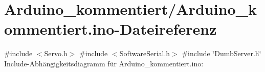 \hypertarget{Arduino__kommentiert_8ino}{}\section{Arduino\+\_\+kommentiert/\+Arduino\+\_\+kommentiert.ino-\/\+Dateireferenz}
\label{Arduino__kommentiert_8ino}
{\ttfamily \#include $<$Servo.\+h$>$}\newline
{\ttfamily \#include $<$Software\+Serial.\+h$>$}\newline
{\ttfamily \#include \char`\"{}Dumb\+Server.\+h\char`\"{}}\newline
Include-\/\+Abhängigkeitsdiagramm für Arduino\+\_\+kommentiert.\+ino\+:
